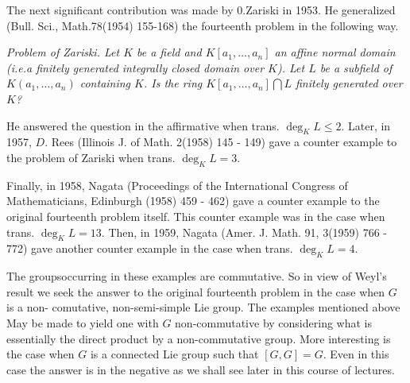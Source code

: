 The  next significant contribution was made  by 0.Zariski in 1953. He
generalized (Bull. Sci., Math.78(1954) 155-168) the fourteenth problem
in the following way. 

\textit{Problem of Zariski. Let  $K$ be  a field
and $K[a_1, \ldots , a_n]$ an affine  normal  domain
(i.e.a finitely generated integrally closed domain over
$K$). Let  $L$ be  a subfield  of $K(a_1 , \ldots
,a_n)$ containing $K$. Is the  ring  
$K[a_1, \ldots , a_n] \bigcap L$ finitely  generated over
$K$?}

He answered the question in the  affirmative  when  trans. $\deg_K L\leq
2$. Later, in  1957, $D$. Rees (Illinois J. of Math. 2(1958) 145 - 149)
gave  a counter  example  to the  problem  of Zariski when
trans. $\deg_K L=3$. 

Finally, in 1958, Nagata (Proceedings of the  International  Congress
of Mathematicians, Edinburgh (1958) 459 - 462) gave a counter example  to
the original  fourteenth problem  itself. This  counter example was in
the case  when trans. $\deg_K L=13$. Then, in  1959,  Nagata
(Amer. J. Math. 91, 3(1959) 766 - 772) gave  another counter example  in
the   case when  trans. $\deg_K L=4$.  

The  groups\pageoriginale  occurring  in these examples  are
commutative. So in view 
of Weyl's  result  we seek the answer to the  original  fourteenth
problem  in the   case  when $G$ is a  non- comutative,
non-semi-simple Lie group. The  examples  mentioned  above  May be
made  to yield  one  with  $G$ non-commutative  by considering  what
is essentially  the direct  product by a non-commutative group. More
interesting is the  case  when $G$ is  a connected Lie group  such
that $[G,G]=G$. Even  in this  case the  answer is in the  negative
as we shall  see later  in this course  of lectures.

